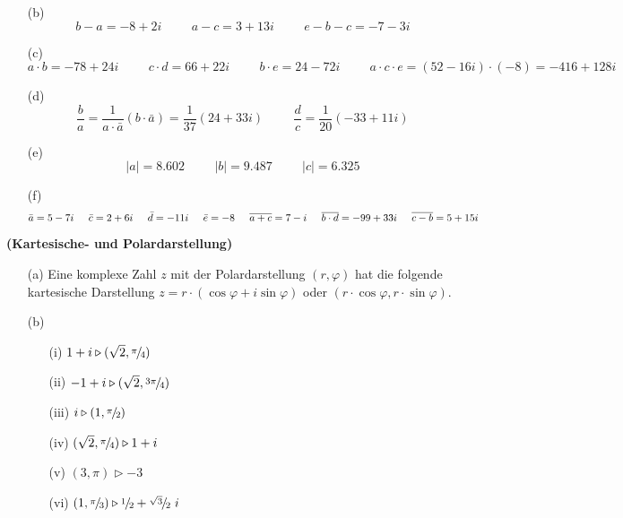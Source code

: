 \documentclass[11pt,a4paper,leqno]{article}
\newcommand{\smfrac}[2]%
{{\raise0.5ex\hbox{$\scriptstyle #1$} \kern-0.1em/\kern-0.15em \lower0.25ex\hbox{$\scriptstyle #2$}}}
\begin{document}
\begin{Gruppenuebungen}
\begin{itemize}
\item[(b)]
$$
b-a=-8+2i \hspace{1cm} a-c=3+13i \hspace{1cm} e-b-c=-7-3i
$$

\item[(c)]
$$
a\cdot b= -78+24i \hspace{1cm} c\cdot d=66+22i \hspace{1cm} b\cdot e=24-72i \hspace{1cm} a\cdot c \cdot e = (52-16i)\cdot (-8) = -416+128i
$$

\item[(d)]
$$
\frac{b}{a}=\frac{1}{a\cdot \bar a}(b\cdot \bar a) = \frac{1}{37} (24+33i) \hspace{1cm} \frac{d}{c}=\frac{1}{20}(-33+11i)
$$

\item[(e)]
$$
|a|= 8.602 \hspace{1cm} |b|= 9.487 \hspace{1cm} |c|= 6.325
$$

\item[(f)]
$$
\bar a = 5-7i \hspace{0.5cm} \bar c = 2+6i \hspace{0.5cm} \bar d = -11i \hspace{0.5cm} \bar e = -8 \hspace{0.5cm} \overline{a+c} = 7-i \hspace{0.5cm} \overline{b\cdot d} = -99+33i \hspace{0.5cm} \overline{c-b}=5+15i
$$

\end{itemize}

\Aufgabe %
\textbf{(Kartesische- und Polardarstellung)}

\begin{itemize}
\item[(a)]
Eine komplexe Zahl $z$ mit der Polardarstellung $(r,\varphi)$ hat die folgende kartesische Darstellung $z = r\cdot (\cos \varphi + i \sin \varphi)$ oder $(r\cdot \cos \varphi,r\cdot \sin \varphi)$.
\item[(b)]
   \begin{itemize}
   \item[(i)]
$1+i \triangleright (\sqrt 2, \smfrac{\pi}{4})$
   \item[(ii)]
$-1+i \triangleright (\sqrt 2, \smfrac{3 \pi}{4})$
   \item[(iii)]
$i \triangleright (1, \smfrac{\pi}{2})$
   \item[(iv)]
$(\sqrt 2, \smfrac{\pi}{4}) \triangleright 1+i$
   \item[(v)]
$(3, \pi) \triangleright -3$
   \item[(vi)]
$(1, \smfrac{\pi}{3}) \triangleright \smfrac{1}{2}+\smfrac{\sqrt 3}{2} \ i$


\end{itemize}
\end{itemize}
\end{Gruppenuebungen}
\end{document}
